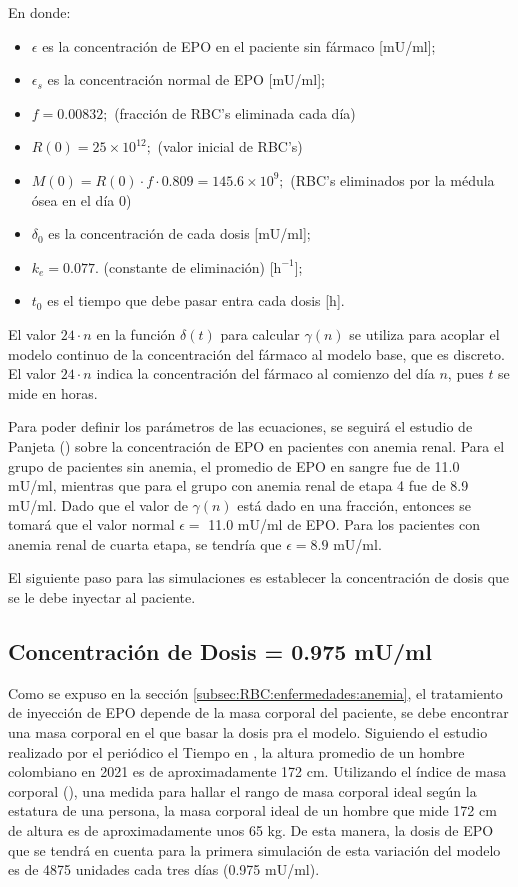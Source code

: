 En donde:
\begin{itemize}
    \item $\epsilon$ es la concentración de EPO en el paciente sin fármaco [mU/ml];
    \item $\epsilon_s$ es la concentración normal de EPO [mU/ml];
    \item $f=0.00832;$ (fracción de RBC's eliminada cada día)
    \item $R(0) = 25\times 10^{12};$ (valor inicial de RBC's)
    \item $M(0) = R(0)\cdot f \cdot 0.809 = 145.6\times 10^{9};$ (RBC's eliminados por la médula ósea en el día 0)
    \item $\delta_0$ es la concentración de cada dosis [mU/ml];
    \item $k_e=0.077.$ (constante de eliminación) [$\textrm{h}^{-1}$];
    \item $t_0$ es el tiempo que debe pasar entra cada dosis [h].
\end{itemize}

El valor $24\cdot n$ en la función $\delta(t)$ para calcular $\gamma(n)$ se utiliza para acoplar el modelo continuo de la concentración del fármaco al modelo base, que es discreto. El valor $24 \cdot n$ indica la concentración del fármaco al comienzo del día $n$, pues $t$ se mide en horas.

Para poder definir los parámetros de las ecuaciones, se seguirá el estudio de Panjeta (\cite{panjeta2017interpretation}) sobre la concentración de EPO en pacientes con anemia renal. Para el grupo de pacientes sin anemia, el promedio de EPO en sangre fue de 11.0 mU/ml, mientras que para el grupo con anemia renal de etapa 4 fue de 8.9 mU/ml. Dado que el valor de $\gamma(n)$ está dado en una fracción, entonces se tomará que el valor normal $\epsilon =$ 11.0 mU/ml de EPO. Para los pacientes con anemia renal de cuarta etapa, se tendría que $\epsilon = 8.9$ mU/ml.

El siguiente paso para las simulaciones es establecer la concentración de dosis que se le debe inyectar al paciente.

\subsection{Concentración de Dosis  = 0.975 mU/ml} \label{subsec:variaciones:anemia:mal}

Como se expuso en la sección \ref{subsec:RBC:enfermedades:anemia}, el tratamiento de inyección de EPO depende de la masa corporal del paciente, se debe encontrar una masa corporal en el que basar la dosis pra el modelo. Siguiendo el estudio realizado por el periódico el Tiempo en \cite{elTiempo}, la altura promedio de un hombre colombiano en 2021 es de aproximadamente 172 cm. Utilizando el índice de masa corporal (\cite{IMC}), una medida para hallar el rango de masa corporal ideal según la estatura de una persona, la masa corporal ideal de un hombre que mide 172 cm de altura es de aproximadamente unos 65 kg. De esta manera, la dosis de EPO que se tendrá en cuenta para la primera simulación de esta variación del modelo es de 4875 unidades cada tres días (0.975 mU/ml).

